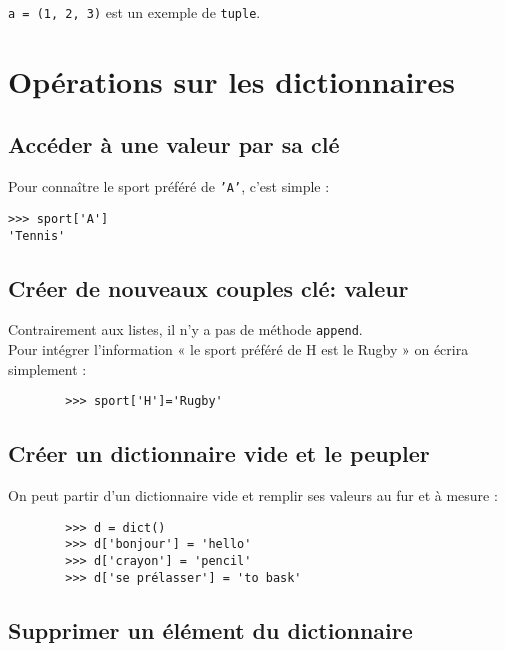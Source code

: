 \texttt{a = (1, 2, 3)} est un exemple de \texttt{tuple}.

\section{Opérations sur les dictionnaires}

\subsection{Accéder à une valeur par sa clé}
Pour connaître le sport préféré de \texttt{'A'}, c'est simple :
\begin{pyc}
    \begin{verbatim}
>>> sport['A']
'Tennis'        
    \end{verbatim}
\end{pyc}


\subsection{Créer de nouveaux couples clé: valeur}

Contrairement aux listes, il n'y a pas de méthode \texttt{append}.\\
Pour intégrer l'information « le sport préféré de H est le Rugby » on écrira simplement :\\
\begin{pyc}
    \begin{verbatim}
        >>> sport['H']='Rugby'
    \end{verbatim}
\end{pyc}


\subsection{Créer un dictionnaire vide et le peupler}

On peut partir d'un dictionnaire vide et remplir ses valeurs au fur et à mesure :

\begin{pyc}
    \begin{verbatim}
        >>> d = dict()
        >>> d['bonjour'] = 'hello'
        >>> d['crayon'] = 'pencil'
        >>> d['se prélasser'] = 'to bask'
    \end{verbatim}
\end{pyc}
\subsection{Supprimer un élément du dictionnaire}

